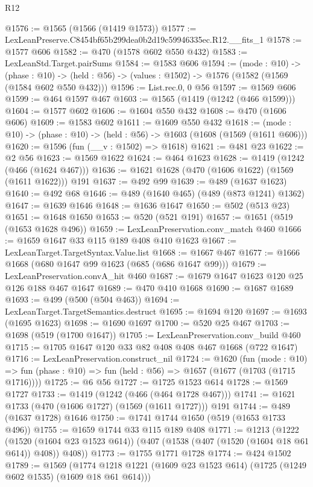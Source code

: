 \begin{lexlean}{R12}
\begin{coremodule}
@1576 := @1565 (@1566 (@1419 @1573))
@1577 := LexLeanPreserve.C8454bf65b299dea0b2d19c59946335ec.R12.__fits_1
@1578 := @1577 @606
@1582 := @470 (@1578 @602 @550 @432)
@1583 := LexLeanStd.Target.pairSums
@1584 := @1583 @606
@1594 := (mode : @10) ->
  (phase : @10) -> (held : @56) -> (values : @1502) -> @1576 (@1582 (@1569 (@1584 @602 @550 @432)))
@1596 := List.rec.{0, 0} @56
@1597 := @1569 @606
@1599 := @464 @1597 @467
@1603 := @1565 (@1419 (@1242 (@466 @1599)))
@1604 := @1577 @602
@1606 := @1604 @550 @432
@1608 := @470 (@1606 @606)
@1609 := @1583 @602
@1611 := @1609 @550 @432
@1618 := (mode : @10) -> (phase : @10) -> (held : @56) -> @1603 (@1608 (@1569 (@1611 @606)))
@1620 := @1596 (fun (__v : @1502) => @1618)
@1621 := @481 @23
@1622 := @2 @56
@1623 := @1569 @1622
@1624 := @464 @1623
@1628 := @1419 (@1242 (@466 (@1624 @467)))
@1636 := @1621 @1628 (@470 (@1606 @1622) (@1569 (@1611 @1622))) @191
@1637 := @492 @99
@1639 := @489 (@1637 @1623)
@1640 := @492 @68
@1646 := @489 (@1640 @465) (@489 (@873 @1241) @1362)
@1647 := @1639 @1646
@1648 := @1636 @1647
@1650 := @502 (@513 @23)
@1651 := @1648 @1650
@1653 := @520 (@521 @191)
@1657 := @1651 (@519 (@1653 @1628 @496))
@1659 := LexLeanPreservation.conv_match @460
@1666 := @1659 @1647 @33 @115 @189 @408 @410 @1623
@1667 := LexLeanTarget.TargetSyntax.Value.list
@1668 := @1667 @467
@1677 := @1666 @1668 (@680 @1647 @99 @1623 (@685 (@686 @1647 @99)))
@1679 := LexLeanPreservation.convA_hit @460
@1687 := @1679 @1647 @1623 @120 @25 @126 @188 @467 @1647
@1689 := @470 @410 @1668
@1690 := @1687 @1689
@1693 := @499 (@500 (@504 @463))
@1694 := LexLeanTarget.TargetSemantics.destruct
@1695 := @1694 @120
@1697 := @1693 (@1695 @1623)
@1698 := @1690 @1697
@1700 := @520 @25 @467
@1703 := @1698 (@519 (@1700 @1647))
@1705 := LexLeanPreservation.conv_build @460
@1715 := @1705 @1647 @120 @33 @82 @408 @408 @467 @1668 (@722 @1647)
@1716 := LexLeanPreservation.construct_nil
@1724 := @1620
    (fun (mode : @10) =>
    fun (phase : @10) => fun (held : @56) => @1657 (@1677 (@1703 (@1715 @1716))))
@1725 := @6 @56
@1727 := @1725 @1523 @614
@1728 := @1569 @1727
@1733 := @1419 (@1242 (@466 (@464 @1728 @467)))
@1741 := @1621 @1733 (@470 (@1606 @1727) (@1569 (@1611 @1727))) @191
@1744 := @489 (@1637 @1728) @1646
@1750 := @1741 @1744 @1650 (@519 (@1653 @1733 @496))
@1755 := @1659 @1744 @33 @115 @189 @408
@1771 := @1213
    (@1222
      (@1520 (@1604 @23 @1523 @614))
      (@407 (@1538 (@407 (@1520 (@1604 @18 @61 @614)) @408)) @408))
@1773 := @1755 @1771 @1728
@1774 := @424 @1502
@1789 := @1569
    (@1774 @1218 @1221 (@1609 @23 @1523 @614) (@1725 (@1249 @602 @1535) (@1609 @18 @61 @614)))

\end{coremodule}
\end{lexlean}
